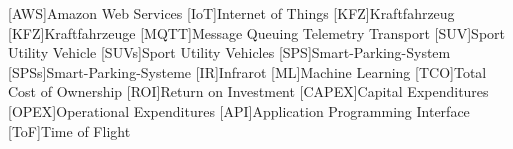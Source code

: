 \begin{acronym}[KFZ]
    [AWS]{Amazon Web Services}
    [IoT]{Internet of Things}
    [KFZ]{Kraftfahrzeug}
    [KFZ]{Kraftfahrzeuge}
    [MQTT]{Message Queuing Telemetry Transport}
    [SUV]{Sport Utility Vehicle}
    [SUVs]{Sport Utility Vehicles}
    [SPS]{Smart-Parking-System}
    [SPSs]{Smart-Parking-Systeme}
    [IR]{Infrarot}
    [ML]{Machine Learning}
    [TCO]{Total Cost of Ownership}
    [ROI]{Return on Investment}
    [CAPEX]{Capital Expenditures}
    [OPEX]{Operational Expenditures}
    [API]{Application Programming Interface}
    [ToF]{Time of Flight}
\end{acronym}